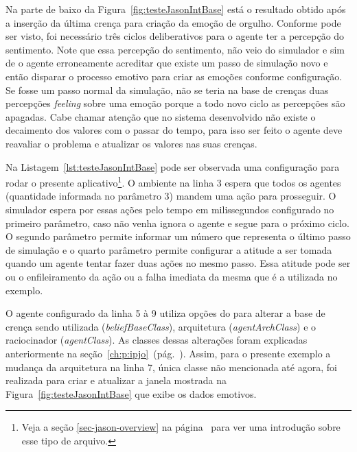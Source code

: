Na parte de baixo da Figura~\ref{fig:testeJasonIntBase} está o resultado
obtido após a inserção da última crença para criação da emoção de orgulho.
Conforme pode ser visto, foi necessário três ciclos deliberativos para o
agente ter a percepção do sentimento. Note que essa percepção do sentimento,
não veio do simulador e sim de o agente erroneamente acreditar que existe um
passo de simulação novo e então disparar o processo emotivo para criar as emoções
conforme configuração. Se fosse um passo normal da simulação, não se
teria na base de crenças duas percepções \emph{feeling} sobre uma emoção
porque a todo novo ciclo as percepções são apagadas. Cabe chamar atenção que
no sistema desenvolvido não existe o decaimento dos valores com o
passar do tempo, para isso ser feito o agente deve reavaliar o problema e
atualizar os valores nas suas crenças.

Na Listagem~\ref{lst:testeJasonIntBase} pode ser observada uma configuração
para rodar o presente aplicativo\footnote{Veja a seção
\ref{sec-jason-overview} na página~\pageref{sec-jason-overview}
para ver uma introdução sobre esse tipo de arquivo.}. O ambiente na linha 3
espera que todos os agentes (quantidade informada no parâmetro 3) mandem
uma ação para prosseguir. O simulador espera por essas ações pelo tempo em milissegundos
configurado no primeiro parâmetro, caso não venha ignora o
agente e segue para o próximo ciclo. O segundo parâmetro permite informar
um número que representa o último passo de simulação e o quarto
parâmetro permite configurar a atitude a ser tomada quando um agente tentar
fazer duas ações no mesmo passo. Essa atitude pode ser ou o enfileiramento da
ação ou a falha imediata da mesma que é a utilizada no exemplo.

\begin{center}
    \begin{minipage}{130mm}
	\lstset{linewidth=130mm}
	
    \end{minipage}
\end{center}

O agente configurado da linha 5 à 9 utiliza opções do \jason para
alterar a base de crença sendo utilizada (\emph{beliefBaseClass}),
arquitetura (\emph{agentArchClass}) e o raciocinador
(\emph{agentClass}). As classes dessas alterações foram explicadas anteriormente
na seção~\ref{ch:p:ipjo}~(pág.~\pageref{ch:p:ipjo}).
Assim, para o presente exemplo a mudança da arquitetura na linha 7, única
classe não mencionada até agora, foi realizada para criar e atualizar a janela
mostrada na Figura~\ref{fig:testeJasonIntBase} que exibe os dados emotivos.

